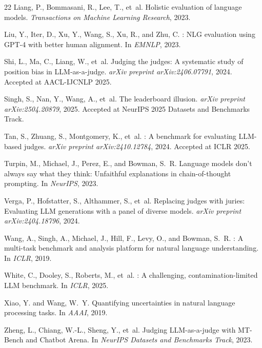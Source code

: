 \documentclass{article}
\begin{document}
\begin{thebibliography}{22}
Liang, P., Bommasani, R., Lee, T., et~al.
\newblock Holistic evaluation of language models.
\newblock \emph{Transactions on Machine Learning Research}, 2023.

Liu, Y., Iter, D., Xu, Y., Wang, S., Xu, R., and Zhu, C.
: {NLG} evaluation using {GPT-4} with better human alignment.
\newblock In \emph{EMNLP}, 2023.

Shi, L., Ma, C., Liang, W., et~al.
\newblock Judging the judges: A systematic study of position bias in {LLM}-as-a-judge.
\newblock \emph{arXiv preprint arXiv:2406.07791}, 2024.
\newblock Accepted at AACL-IJCNLP 2025.

Singh, S., Nan, Y., Wang, A., et~al.
\newblock The leaderboard illusion.
\newblock \emph{arXiv preprint arXiv:2504.20879}, 2025.
\newblock Accepted at NeurIPS 2025 Datasets and Benchmarks Track.

Tan, S., Zhuang, S., Montgomery, K., et~al.
: A benchmark for evaluating {LLM}-based judges.
\newblock \emph{arXiv preprint arXiv:2410.12784}, 2024.
\newblock Accepted at ICLR 2025.

Turpin, M., Michael, J., Perez, E., and Bowman, S.~R.
\newblock Language models don't always say what they think: Unfaithful explanations in chain-of-thought prompting.
\newblock In \emph{NeurIPS}, 2023.

Verga, P., Hofstatter, S., Althammer, S., et~al.
\newblock Replacing judges with juries: Evaluating {LLM} generations with a panel of diverse models.
\newblock \emph{arXiv preprint arXiv:2404.18796}, 2024.

Wang, A., Singh, A., Michael, J., Hill, F., Levy, O., and Bowman, S.~R.
: A multi-task benchmark and analysis platform for natural language understanding.
\newblock In \emph{ICLR}, 2019.

White, C., Dooley, S., Roberts, M., et~al.
: A challenging, contamination-limited {LLM} benchmark.
\newblock In \emph{ICLR}, 2025.

Xiao, Y. and Wang, W.~Y.
\newblock Quantifying uncertainties in natural language processing tasks.
\newblock In \emph{AAAI}, 2019.

Zheng, L., Chiang, W.-L., Sheng, Y., et~al.
\newblock Judging {LLM}-as-a-judge with {MT-Bench} and {Chatbot Arena}.
\newblock In \emph{NeurIPS Datasets and Benchmarks Track}, 2023.

\end{thebibliography}
\end{document}
